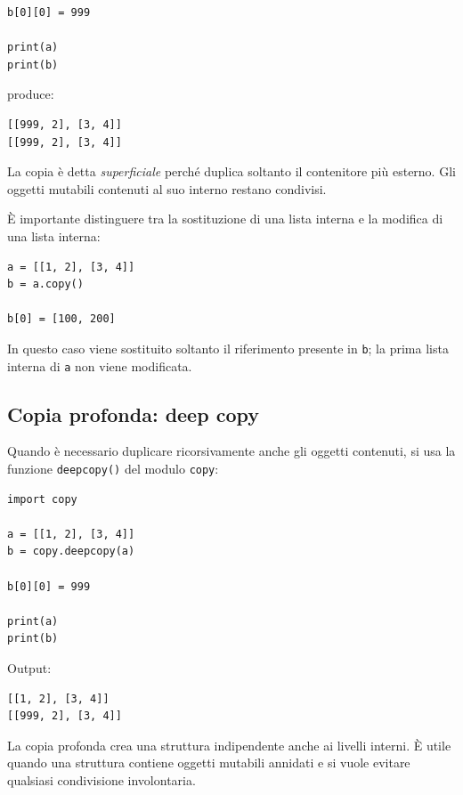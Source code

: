 \documentclass[11pt,a4paper]{book}
\begin{document}
\begin{lstlisting}[style=python]
b[0][0] = 999

print(a)
print(b)
\end{lstlisting}

produce:

\begin{lstlisting}[style=python, numbers=none]
[[999, 2], [3, 4]]
[[999, 2], [3, 4]]
\end{lstlisting}

La copia è detta \emph{superficiale} perché duplica soltanto il contenitore più esterno. Gli oggetti mutabili contenuti al suo interno restano condivisi.

È importante distinguere tra la sostituzione di una lista interna e la modifica di una lista interna:

\begin{lstlisting}[style=python]
a = [[1, 2], [3, 4]]
b = a.copy()

b[0] = [100, 200]
\end{lstlisting}

In questo caso viene sostituito soltanto il riferimento presente in \texttt{b}; la prima lista interna di \texttt{a} non viene modificata.

\subsection{Copia profonda: deep copy}

Quando è necessario duplicare ricorsivamente anche gli oggetti contenuti, si usa la funzione \texttt{deepcopy()} del modulo \texttt{copy}:

\begin{lstlisting}[style=python]
import copy

a = [[1, 2], [3, 4]]
b = copy.deepcopy(a)

b[0][0] = 999

print(a)
print(b)
\end{lstlisting}

Output:

\begin{lstlisting}[style=python, numbers=none]
[[1, 2], [3, 4]]
[[999, 2], [3, 4]]
\end{lstlisting}

La copia profonda crea una struttura indipendente anche ai livelli interni. È utile quando una struttura contiene oggetti mutabili annidati e si vuole evitare qualsiasi condivisione involontaria.
\end{document}
